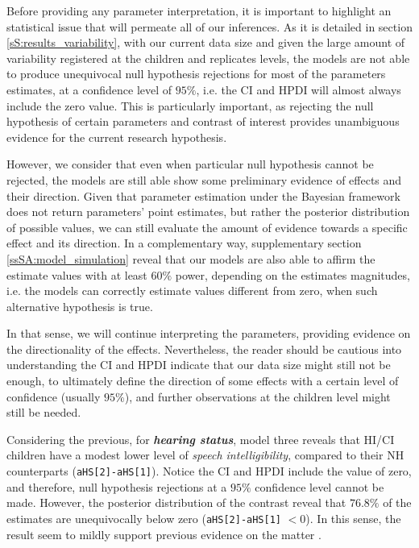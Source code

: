 Before providing any parameter interpretation, it is important to highlight an statistical issue that will permeate all of our inferences. As it is detailed in section \ref{sS:results_variability}, with our current data size and given the large amount of variability registered at the children and replicates levels, the models are not able to produce unequivocal null hypothesis rejections for most of the parameters estimates, at a confidence level of $95\%$, i.e. the CI and HPDI will almost always include the zero value. This is particularly important, as rejecting the null hypothesis of certain parameters and contrast of interest provides unambiguous evidence for the current research hypothesis.

However, we consider that even when particular null hypothesis cannot be rejected, the models are still able show some preliminary evidence of effects and their direction. Given that parameter estimation under the Bayesian framework does not return parameters' point estimates, but rather the posterior distribution of possible values, we can still evaluate the amount of evidence towards a specific effect and its direction. In a complementary way, supplementary section \ref{ssSA:model_simulation} reveal that our models are also able to affirm the estimate values with at least $60\%$ power, depending on the estimates magnitudes, i.e. the models can correctly estimate values different from zero, when such alternative hypothesis is true. 

In that sense, we will continue interpreting the parameters, providing evidence on the directionality of the effects. Nevertheless, the reader should be cautious into understanding the CI and HPDI indicate that our data size might still not be enough, to ultimately define the direction of some effects with a certain level of confidence (usually $95\%$), and further observations at the children level might still be needed.

Considering the previous, for \textbf{\textit{hearing status}}, model three reveals that HI/CI children have a modest lower level of \textit{speech intelligibility}, compared to their NH counterparts (\texttt{aHS[2]-aHS[1]}). Notice the CI and HPDI include the value of zero, and therefore, null hypothesis rejections at a $95\%$ confidence level cannot be made. However, the posterior distribution of the contrast reveal that $76.8\%$ of the estimates are unequivocally below zero (\texttt{aHS[2]-aHS[1]} $< 0$). In this sense, the result seem to mildly support previous evidence on the matter \cite{Nicholas_et_al_2007, Castellanos_et_al_2014, Chin_et_al_2014, Geers_et_al_2016, Freeman_et_al_2017, Duchesne_et_al_2019, Grandon_et_al_2020}. 

